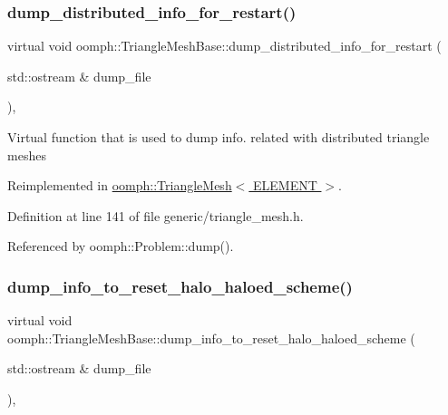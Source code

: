\subsubsection{\texorpdfstring{dump\+\_\+distributed\+\_\+info\+\_\+for\+\_\+restart()}{dump\_distributed\_info\_for\_restart()}}
{\footnotesize\ttfamily virtual void oomph\+::\+Triangle\+Mesh\+Base\+::dump\+\_\+distributed\+\_\+info\+\_\+for\+\_\+restart (\begin{DoxyParamCaption}\item[{std\+::ostream \&}]{dump\+\_\+file }\end{DoxyParamCaption})\hspace{0.3cm}{\ttfamily [inline]}, {\ttfamily [virtual]}}

Virtual function that is used to dump info. related with distributed triangle meshes 

Reimplemented in \hyperlink{classoomph_1_1TriangleMesh_ab4472dde562e25eaa590557a38ead8c3}{oomph\+::\+Triangle\+Mesh$<$ E\+L\+E\+M\+E\+N\+T $>$}.



Definition at line 141 of file generic/triangle\+\_\+mesh.\+h.



Referenced by oomph\+::\+Problem\+::dump().

\mbox{\label{classoomph_1_1TriangleMeshBase_a4254c01acfaf43213d96491902334148}} 
\subsubsection{\texorpdfstring{dump\+\_\+info\+\_\+to\+\_\+reset\+\_\+halo\+\_\+haloed\+\_\+scheme()}{dump\_info\_to\_reset\_halo\_haloed\_scheme()}}
{\footnotesize\ttfamily virtual void oomph\+::\+Triangle\+Mesh\+Base\+::dump\+\_\+info\+\_\+to\+\_\+reset\+\_\+halo\+\_\+haloed\+\_\+scheme (\begin{DoxyParamCaption}\item[{std\+::ostream \&}]{dump\+\_\+file }\end{DoxyParamCaption})\hspace{0.3cm}{\ttfamily [inline]}, {\ttfamily [virtual]}}

